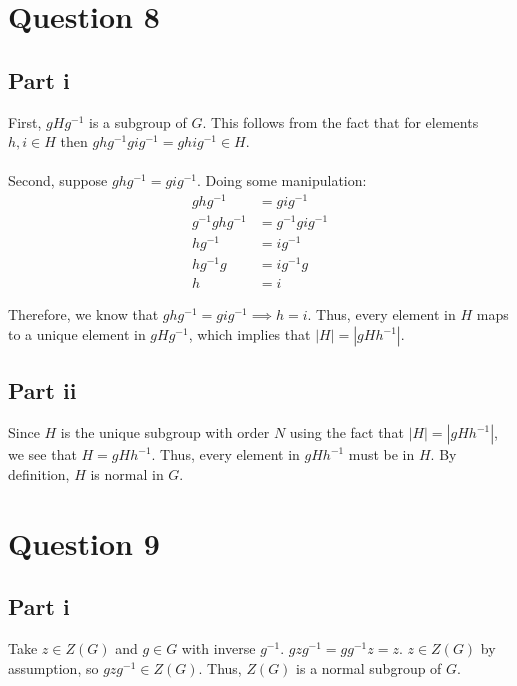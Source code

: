 \documentclass[letterpaper]{article}
\begin{document}
\section{Question 8}
\label{sec:Question8}

\subsection{Part i}
\label{subsec:8Parti}

First, $ gHg^{-1} $ is a subgroup of $ G $.
This follows from the fact that for elements $ h, i \in H $ then $ ghg^{-1} gig^{-1} = ghig^{-1} \in H $.
\\ \\
Second, suppose $ ghg^{-1} = gig^{-1} $.
Doing some manipulation:
\begin{align}
    ghg^{-1} &= gig^{-1} \\
    g^{-1}ghg^{-1} &= g^{-1}gig^{-1} \\
    hg^{-1} &= ig^{-1} \\
    hg^{-1}g &= ig^{-1}g \\
    h &= i
\end{align}

Therefore, we know that $ ghg^{-1} = gig^{-1} \implies h = i $.
Thus, every element in $ H $ maps to a unique element in $ gHg^{-1} $, which implies that $ |H| = |gHh^{-1}| $.

\subsection{Part ii}
\label{subsec:8Partii}

Since $ H $ is the unique subgroup with order $ N $ using the fact that $ |H| = |gHh^{-1}| $, we see that $ H = gHh^{-1} $.
Thus, every element in $ gHh^{-1} $ must be in $ H $.
By definition, $ H $ is normal in $ G $.


\section{Question 9}
\label{sec:Question9}

\subsection{Part i}
\label{subsec:9Parti}

Take $ z \in Z(G) $ and $ g \in G $ with inverse $ g^{-1} $.
$ gzg^{-1} = gg^{-1}z = z $.
$ z \in Z(G) $ by assumption, so $ gzg^{-1} \in Z(G) $.
Thus, $ Z(G) $ is a normal subgroup of $ G $.
\end{document}
